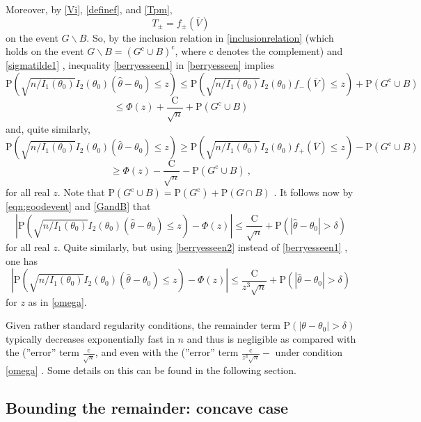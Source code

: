 Moreover, by \eqref{Vi}, \eqref{definef}, and \eqref{Tpm},
$$
T_{\pm}=f_{\pm}(\overline{V})
$$
on the event $G\backslash B$. So, by the inclusion relation in \eqref{inclusionrelation} (which holds on the event $G\backslash B=(G^{\mathrm{c}}\cup B)^{\mathrm{c}}$, where $\mathrm{c}$ denotes the complement) and \eqref{sigmatilde1} , inequality \eqref{berryesseen1} in \ref{berryesseen} implies
$$
\mathrm{P}(\sqrt{n/I_1(\theta_{0})}I_2(\theta_0)(\hat{\theta}-\theta_{0})\leq z)\leq \mathrm{P}(\sqrt{n/I_1(\theta_{0})}I_2(\theta_0)f_{-}(\overline{V})\leq z)+\mathrm{P}(G^{\mathrm{c}}\cup B)
$$
$$
\leq\Phi(z)+\frac{\mathrm{C}}{\sqrt{n}}+\mathrm{P}(G^{\mathrm{c}}\cup B)
$$
and, quite similarly,
$$
\mathrm{P}(\sqrt{n/I_1(\theta_{0})}I_2(\theta_0)(\hat{\theta}-\theta_{0})\leq z)\geq \mathrm{P}(\sqrt{n/I_1(\theta_{0})}I_2(\theta_0)f_{+}(\overline{V})\leq z)-\mathrm{P}(G^{\mathrm{c}}\cup B)
$$
$$
\geq\Phi(z)-\frac{\mathrm{C}}{\sqrt{n}}-\mathrm{P}(G^{\mathrm{c}}\cup B)\ ,
$$
for all real $z$. Note that $\mathrm{P}(G^{\mathrm{c}}\cup B)=\mathrm{P}(G^{\mathrm{c}})+\mathrm{P}(G\cap B)$ . It follows now by \eqref{eqn:goodevent} and \eqref{GandB} that
\begin{equation}
	|\displaystyle \mathrm{P}(\sqrt{n/I_1(\theta_{0})}I_2(\theta_0)(\hat{\theta}-\theta_{0})\leq z)-\Phi(z)|\leq\frac{\mathrm{C}}{\sqrt{n}}+\mathrm{P}(|\hat{\theta}-\theta_{0}|>\delta)
\end{equation}
for all real $z$. Quite similarly, but using \eqref{berryesseen2} instead of \eqref{berryesseen1} , one has
\begin{equation}
	|\displaystyle \mathrm{P}(\sqrt{n/I_1(\theta_{0})}I_2(\theta_0)(\hat{\theta}-\theta_{0})\leq z)-\Phi(z)|\leq\frac{\mathrm{C}}{z^{3}\sqrt{n}}+\mathrm{P}(|\hat{\theta}-\theta_{0}|>\delta)
\end{equation}
for $z$ as in \eqref{omega}.

Given rather standard regularity conditions, the remainder term $\mathrm{P}(|\theta-\theta_{0}|>\delta)$ typically decreases exponentially fast in $n$ and thus is negligible as compared with the (''error'' term $\displaystyle \frac{\mathrm{c}}{\sqrt{n}}$, and even with the (''error'' term $\displaystyle \frac{\mathrm{c}}{z^{3}\sqrt{n}}-$ under condition \eqref{omega} . Some details on this can be found in the following section.

\subsection*{Bounding the remainder: concave case}

